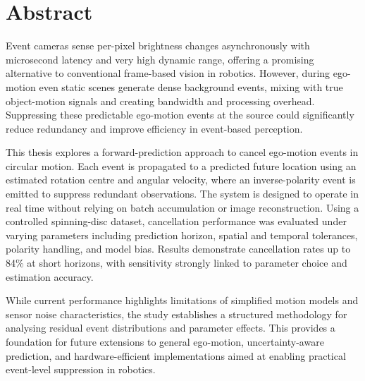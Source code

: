 \chapter*{Abstract}

Event cameras sense per-pixel brightness changes asynchronously with microsecond latency and very high dynamic range, offering a promising alternative to conventional frame-based vision in robotics. However, during ego-motion even static scenes generate dense background events, mixing with true object-motion signals and creating bandwidth and processing overhead. Suppressing these predictable ego-motion events at the source could significantly reduce redundancy and improve efficiency in event-based perception.

This thesis explores a forward-prediction approach to cancel ego-motion events in circular motion. Each event is propagated to a predicted future location using an estimated rotation centre and angular velocity, where an inverse-polarity event is emitted to suppress redundant observations. The system is designed to operate in real time without relying on batch accumulation or image reconstruction. Using a controlled spinning-disc dataset, cancellation performance was evaluated under varying parameters including prediction horizon, spatial and temporal tolerances, polarity handling, and model bias. Results demonstrate cancellation rates up to 84\% at short horizons, with sensitivity strongly linked to parameter choice and estimation accuracy. 

While current performance highlights limitations of simplified motion models and sensor noise characteristics, the study establishes a structured methodology for analysing residual event distributions and parameter effects. This provides a foundation for future extensions to general ego-motion, uncertainty-aware prediction, and hardware-efficient implementations aimed at enabling practical event-level suppression in robotics.
